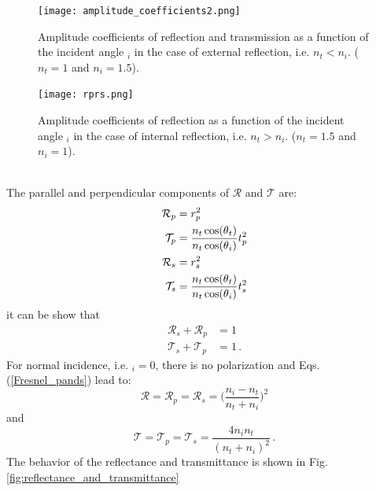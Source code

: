 \begin{figure}[h]
  \begin{minipage}[h]{0.4\textwidth}
    \texttt{[image: amplitude\_coefficients2.png]}
    \caption{Amplitude coefficients of reflection and transmission as a function of the incident angle \myangle$_i$ in the case of external reflection, i.e. $n_t<n_i$. 
($n_t = 1$ and $n_i=1.5$).}
    \label{fig:coefficients}
  \end{minipage} \hspace{2.5cm}
  \begin{minipage}[h]{0.4\textwidth}
    \texttt{[image: rprs.png]}
    \caption{Amplitude coefficients of reflection as a function of the incident angle \myangle$_i$ in the case of internal reflection, i.e. $n_t>n_i$. 
($n_t = 1.5$ and $n_i=1$).}
   \label{fig:coefficients2}
 \end{minipage}
\end{figure}
\\ The parallel and perpendicular components of $\mathcal{R}$ and $\mathcal{T}$ are:
\begin{equation}\label{Fresnel_pands}
\begin{split}
\mathcal{R}_p& =  {r_p^2}\\
\mathcal{T}_p &=  \frac{n_t \cos(\mbox{$\theta$}_t)}{n_t \cos(\mbox{$\theta$}_i)}t_p^2\\
\mathcal{R}_s &=  r_s^2\\
\mathcal{T}_s &= \frac{n_t \cos(\mbox{$\theta$}_t)}{n_t \cos(\mbox{$\theta$}_i)}t_s^2\\
\end{split}
\end{equation}
it can be show that
\begin{equation}
\begin{split}
\mathcal{R}_s+\mathcal{R}_p &= 1\\
\mathcal{T}_s+\mathcal{T}_p &=1\,.
\end{split}
\end{equation}
For normal incidence, i.e. \myangle$_i = 0$, there is no polarization and Eqs. (\ref{Fresnel_pands}) lead to:
\begin{equation}
\mathcal{R} = \mathcal{R}_p = \mathcal{R}_s = \Bigg(\frac{n_i-n_t}{n_t+n_i}\Bigg)^2
\end{equation}
and 
\begin{equation}
\mathcal{T} = \mathcal{T}_p = \mathcal{T}_s = \frac{4n_i n_t}{(n_t+n_i)^2}\,.
\end{equation}
The behavior of the reflectance and transmittance is shown in Fig. \ref{fig:reflectance_and_transmittance}
